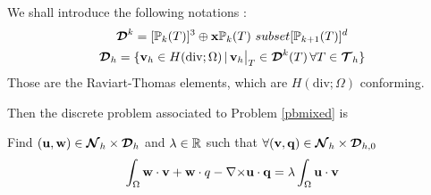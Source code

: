 We shall introduce the following notations :
\begin{gather*}
{\bm{\mathcal{D}}}^k = [{\mathbb{P}}_k(T)]^3 \oplus{\mathbf{x}}{\mathbb{P}}_k(T) \ subset [{\mathbb{P}}_{k+1}(T)]^d\\
{\bm{\mathcal{D}}}_h = \{{\mathbf{v}}_h\in H(\mathrm{div};\Omega) \,|\,
{\mathbf{v}}_h{\big\rvert_{T}}\in{\bm{\mathcal{D}}}^k(T)\, \forall T\in {\bm{\mathcal{T}}}_h \}
\end{gather*}
Those are the Raviart-Thomas elements, which are $H(\mathrm{div};\Omega)$
conforming.

Then the discrete problem associated to Problem \ref{pbmixed} is 
\begin{pb}\label{pbmixeddiscr}
Find $({\mathbf{u}},{\mathbf{w}})\in{\bm{\mathcal{N}}}_h\times{\bm{\mathcal{D}}}_h$ and $\lambda\in{\mathbb{R}}$ such that
$\forall ({\mathbf{v}},{\mathbf{q}}) \in{\bm{\mathcal{N}}}_h\times{\bm{\mathcal{D}}}_{h,0}$
\[ \int_\Omega {\mathbf{w}}\cdot{\mathbf{v}}+{\mathbf{w}}\cdot{q}-{\nabla\times}{\mathbf{u}}\cdot{\mathbf{q}} =
\lambda\int_\Omega {\mathbf{u}}\cdot{\mathbf{v}} \]
\end{pb}

